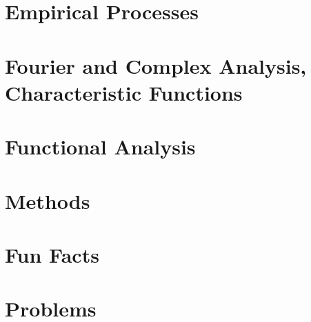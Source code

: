 \documentclass[12pt, oneside]{book}
\begin{document}
    \chapter{Empirical Processes}
    \appendix
    \chapter{Fourier and Complex Analysis, Characteristic Functions}
    \chapter{Functional Analysis}
    \chapter{Methods}
    \chapter{Fun Facts}
    \chapter{Problems}
\end{document}
